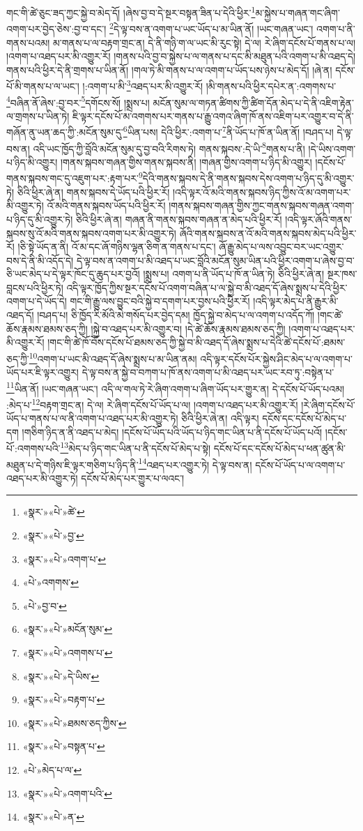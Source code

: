གང་གི་ཚེ་ཅུང་ཟད་ཀྱང་སྐྱེ་བ་མེད་དོ། །ཞེས་བྱ་བ་དེ་སྔར་བསྟན་ཟིན་པ་དེའི་ཕྱིར་\footnote{«སྣར་»«པེ་»ཚེ་}མ་སྐྱེས་པ་གཞན་གང་ཞིག་འགག་པར་བྱེད་ཅེས་:བྱ་བ་དང་། \footnote{«སྣར་»«པེ་»བྱ་}དེ་ལྟ་བས་ན་འགག་པ་ཡང་ཡོད་པ་མ་ཡིན་ནོ། །ཡང་གཞན་ཡང་། འགག་པ་ནི་གནས་པའམ། མ་གནས་པ་ལ་བརྟག་གྲང་ན། དེ་ནི་གཉི་ག་ལ་ཡང་མི་རུང་སྟེ། དེ་ལ། རེ་ཞིག་དངོས་པོ་གནས་པ་ལ། །འགག་པ་འཐད་པར་མི་འགྱུར་རོ། །གནས་པའི་བྱ་བ་སྐྱེས་པ་ལ་གནས་པ་དང་མི་མཐུན་པའི་འགག་པ་མི་འཐད་དེ། གནས་པའི་ཕྱིར་དེ་ནི་གྲགས་པ་ཡིན་ནོ། །གལ་ཏེ་མི་གནས་པ་ལ་འགག་པ་ཡོད་པས་ཉེས་པ་མེད་དོ། །ཞེ་ན། དངོས་པོ་མི་གནས་པ་ལ་ཡང་། །:འགག་པ་མི་\footnote{«སྣར་»«པེ་»འགག་པ་}འཐད་པར་མི་འགྱུར་རོ། །མི་གནས་པའི་ཕྱིར་དཔེར་ན་:འགགས་པ་\footnote{«པེ་»འགགས་}བཞིན་ནོ་ཞེས་:བྱ་བར་\footnote{«པེ་»བྱ་བ་}དགོངས་སོ། །སྨྲས་པ། མངོན་སུམ་ལ་གཏན་ཚིགས་ཀྱི་ཚིག་དོན་མེད་པ་དེ་ནི་འཇིག་རྟེན་ལ་གྲགས་པ་ཡིན་ཏེ། ཇི་ལྟར་དངོས་པོ་མ་འགགས་པར་གནས་པ་རྒྱུ་འགའ་ཞིག་ཁོ་ནས་འཇིག་པར་འགྱུར་བ་དེ་ནི་གཞོན་ནུ་ཡན་ཆད་ཀྱི་:མངོན་སུམ་དུ་\footnote{«སྣར་»«པེ་»མངོན་སུམ་}ཡིན་པས། དེའི་ཕྱིར་:འགག་པ་\footnote{«སྣར་»«པེ་»འགགས་པ་}ནི་ཡོད་པ་ཁོ་ན་ཡིན་ནོ། །བཤད་པ། དེ་ལྟ་བས་ན། འདི་ཡང་ཁྱོད་ཀྱི་བློའི་མངོན་སུམ་དུ་བྱ་བའི་རིགས་ཏེ། གནས་སྐབས་:དེ་ཡི་\footnote{«སྣར་»«པེ་»དེ་ཡིས་}གནས་པ་ནི། །དེ་ཡིས་འགག་པ་ཉིད་མི་འགྱུར། །གནས་སྐབས་གཞན་གྱིས་གནས་སྐབས་ནི། །གཞན་གྱིས་འགག་པ་ཉིད་མི་འགྱུར། །དངོས་པོ་གནས་སྐབས་གང་དུ་འཇུག་པར་:རྟག་པར་\footnote{«སྣར་»«པེ་»བརྟག་པ་}དེའི་གནས་སྐབས་དེ་ནི་གནས་སྐབས་དེས་འགག་པ་ཉིད་དུ་མི་འགྱུར་ཏེ། ཅིའི་ཕྱིར་ཞེ་ན། གནས་སྐབས་དེ་ཡོད་པའི་ཕྱིར་རོ། །འདི་ལྟར་འོ་མའི་གནས་སྐབས་ཉིད་ཀྱིས་འོ་མ་འགག་པར་མི་འགྱུར་ཏེ། འོ་མའི་གནས་སྐབས་ཡོད་པའི་ཕྱིར་རོ། །གནས་སྐབས་གཞན་གྱིས་ཀྱང་གནས་སྐབས་གཞན་འགག་པ་ཉིད་དུ་མི་འགྱུར་ཏེ། ཅིའི་ཕྱིར་ཞེ་ན། གཞན་ནི་གནས་སྐབས་གཞན་ན་མེད་པའི་ཕྱིར་རོ། །འདི་ལྟར་ཞོའི་གནས་སྐབས་སུ་འོ་མའི་གནས་སྐབས་འགག་པར་མི་འགྱུར་ཏེ། ཞོའི་གནས་སྐབས་ན་འོ་མའི་གནས་སྐབས་མེད་པའི་ཕྱིར་རོ། །ཅི་སྟེ་ཡོད་ན་ནི། འོ་མ་དང་ཞོ་གཉིས་ལྷན་ཅིག་ན་གནས་པ་དང་། ཞོ་རྒྱུ་མེད་པ་ལས་འབྱུང་བར་ཡང་འགྱུར་བས་དེ་ནི་མི་འདོད་དེ། དེ་ལྟ་བས་ན་འགག་པ་མི་འཐད་པ་ཡང་བློའི་མངོན་སུམ་ཡིན་པའི་ཕྱིར་འགག་པ་ཞེས་བྱ་བ་ཅི་ཡང་མེད་པ་དེ་ལྟར་ཁོང་དུ་ཆུད་པར་བྱའོ། །སྨྲས་པ། འགག་པ་ནི་ཡོད་པ་ཁོ་ན་ཡིན་ཏེ། ཅིའི་ཕྱིར་ཞེ་ན། སྔར་ཁས་བླངས་པའི་ཕྱིར་ཏེ། འདི་ལྟར་ཁྱོད་ཀྱིས་སྔར་དངོས་པོ་འགག་བཞིན་པ་ལ་སྐྱེ་བ་མི་འཐད་དོ་ཞེས་སྨྲས་པ་དེའི་ཕྱིར་འགག་པ་དེ་ཡོད་དེ། གང་གི་རྒྱུ་ལས་བྱུང་བའི་སྐྱེ་བ་དགག་པར་བྱས་པའི་ཕྱིར་རོ། །འདི་ལྟར་མེད་པ་ནི་རྒྱུར་མི་འཐད་དོ། །བཤད་པ། ཅི་ཁྱོད་རི་མོའི་མེ་གསོད་པར་བྱེད་དམ། ཁྱོད་སྐྱེ་བ་མེད་པ་ལ་འགག་པ་འདོད་ཀོ། །གང་ཚེ་ཆོས་རྣམས་ཐམས་ཅད་ཀྱི། །སྐྱེ་བ་འཐད་པར་མི་འགྱུར་བ། །དེ་ཚེ་ཆོས་རྣམས་ཐམས་ཅད་ཀྱི། །འགག་པ་འཐད་པར་མི་འགྱུར་རོ། །གང་གི་ཚེ་ཁོ་བོས་དངོས་པོ་ཐམས་ཅད་ཀྱི་སྐྱེ་བ་མི་འཐད་དོ་ཞེས་སྨྲས་པ་དེའི་ཚེ་དངོས་པོ་:ཐམས་ཅད་ཀྱི་\footnote{«སྣར་»«པེ་»ཐམས་ཅད་ཀྱིས་}འགག་པ་ཡང་མི་འཐད་དོ་ཞེས་སྨྲས་པ་མ་ཡིན་ནམ། འདི་ལྟར་དངོས་པོར་སྐྱེས་ཤིང་མེད་པ་ལ་འགག་པ་ཡོད་པར་ཇི་ལྟར་འགྱུར། དེ་ལྟ་བས་ན་སྐྱེ་བ་བཀག་པ་ཁོ་ནས་འགག་པ་མི་འཐད་པར་ཡང་རབ་ཏུ་:བསྟེན་པ་\footnote{«སྣར་»«པེ་»བསྟན་པ་}ཡིན་ནོ། །ཡང་གཞན་ཡང་། འདི་ལ་གལ་ཏེ་རེ་ཞིག་འགག་པ་ཞིག་ཡོད་པར་གྱུར་ན། དེ་དངོས་པོ་ཡོད་པའམ། :མེད་པ་\footnote{«པེ་»མེད་པ་ལ་}བརྟག་གྲང་ན། དེ་ལ། རེ་ཞིག་དངོས་པོ་ཡོད་པ་ལ། །འགག་པ་འཐད་པར་མི་འགྱུར་རོ། །རེ་ཞིག་དངོས་པོ་ཡོད་པ་གནས་པ་ལ་ནི་འགག་པ་འཐད་པར་མི་འགྱུར་ཏེ། ཅིའི་ཕྱིར་ཞེ་ན། འདི་ལྟར། དངོས་དང་དངོས་པོ་མེད་པ་དག །གཅིག་ཉིད་ན་ནི་འཐད་པ་མེད། །དངོས་པོ་ཡོད་པའི་ཡོད་པ་ཉིད་གང་ཡིན་པ་ནི་དངོས་པོ་ཡོད་པའོ། །དངོས་པོ་:འགགས་པའི་\footnote{«སྣར་»«པེ་»འགག་པའི་}མེད་པ་ཉིད་གང་ཡིན་པ་ནི་དངོས་པོ་མེད་པ་སྟེ། དངོས་པོ་དང་དངོས་པོ་མེད་པ་ཕན་ཚུན་མི་མཐུན་པ་དེ་གཉིས་ཇི་ལྟར་གཅིག་པ་ཉིད་ནི་\footnote{«སྣར་»«པེ་»ན་}འཐད་པར་འགྱུར་ཏེ། དེ་ལྟ་བས་ན། དངོས་པོ་ཡོད་པ་ལ་འགག་པ་འཐད་པར་མི་འགྱུར་ཏེ། དངོས་པོ་མེད་པར་གྱུར་པ་ལའང་། 